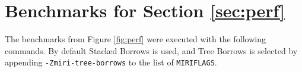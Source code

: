 \documentclass[a4paper,11pt]{article}
\theoremstyle{plain}
\theoremstyle{definition}
\theoremstyle{remark}
\begin{document}

\newpage



\newpage

\appendix

\section{Benchmarks for Section \ref{sec:perf}}
\label{app:perf}

The benchmarks from Figure \ref{fig:perf} were executed with the following commands.
By default Stacked Borrows is used, and Tree Borrows is selected by appending
\texttt{-Zmiri-tree-borrows} to the list of \texttt{MIRIFLAGS}.
\end{document}

